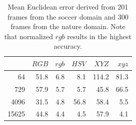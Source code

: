 \documentclass[11pt]{article}
\begin{document}
\begin{table}
\centering
\begin{tabular}{r||r|r|r|r|r}
	      & $RGB$ & $rgb$ & $HSV$ & $XYZ$ & $xyz$ \\ \hline \hline
	   64 &  51.8 &   6.8 &   8.1 & 114.2 &  81.3 \\ \hline
	  729 &  57.9 &   5.7 &   5.7 &  45.8 &  66.5 \\ \hline
	 4096 &  31.5 &   4.8 &  56.8 &  58.4 &   5.5 \\ \hline
	15625	&  44.8 &   4.4 &   4.5 &  57.9 &   4.1 \\ \hline
\end{tabular}
\caption{Mean Euclidean error derived from 201 frames from the soccer domain and
300 frames from the nature domain. Note that normalized $rgb$ results in the
highest accuracy.}
\label{table:error}
\end{table}
\end{document}

